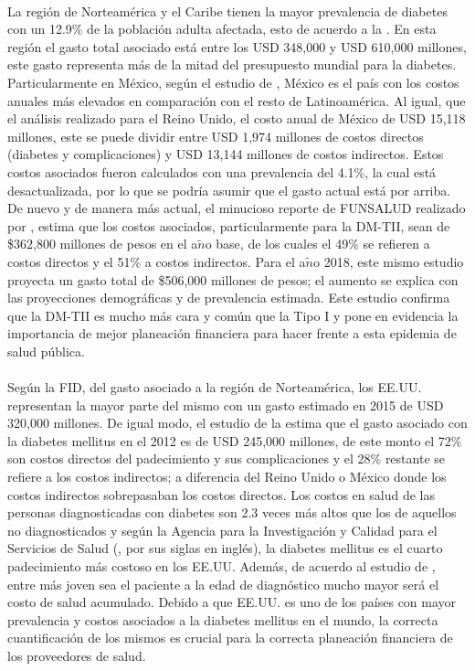 \\
La regi\'on de Norteam\'erica y el Caribe tienen la mayor prevalencia de diabetes con un 12.9\% de la poblaci\'on adulta afectada, esto de acuerdo a la \cite{atlas2015international}. En esta regi\'on el gasto total asociado est\'a entre los USD 348,000 y USD 610,000 millones, este gasto representa m\'as de la mitad del presupuesto mundial para la diabetes. Particularmente en M\'exico, seg\'un el estudio de \cite{barcelo2003cost}, M\'exico es el pa\'is con los costos anuales m\'as elevados en comparaci\'on con el resto de Latinoam\'erica. Al igual, que el an\'alisis realizado para el Reino Unido, el costo anual de M\'exico de USD 15,118 millones, este se puede dividir entre USD 1,974 millones de costos directos (diabetes y complicaciones) y USD 13,144 millones de costos indirectos. Estos costos asociados fueron calculados con una prevalencia del 4.1\%, la cual est\'a desactualizada, por lo que se podr\'ia asumir que el gasto actual est\'a por arriba. De nuevo y de manera m\'as actual, el minucioso reporte de FUNSALUD realizado por \cite{barraza2015carga}, estima que los costos asociados, particularmente para la DM-TII, sean de \$362,800 millones de pesos en el a$\tilde{n}$o base, de los cuales el 49\% se refieren a costos directos y el 51\% a costos indirectos. Para el a$\tilde{n}$o 2018, este mismo estudio proyecta un gasto total de \$506,000 millones de pesos; el aumento se explica con las proyecciones demogr\'aficas y de prevalencia estimada. Este estudio confirma que la DM-TII es mucho m\'as cara y com\'un que la Tipo I y pone en evidencia la importancia de mejor planeaci\'on financiera para hacer frente a esta epidemia de salud p\'ublica.\\
\\   
Seg\'un la FID, del gasto asociado a la regi\'on de Norteam\'erica, los EE.UU. representan la mayor parte del mismo con un gasto estimado en 2015 de USD 320,000 millones. De igual modo, el estudio de la \cite{american2013economic} estima que el gasto asociado con la diabetes mellitus en el 2012 es de USD 245,000 millones, de este monto el 72\% son costos directos del padecimiento y sus complicaciones y el 28\% restante se refiere a los costos indirectos; a diferencia del Reino Unido o M\'exico donde los costos indirectos sobrepasaban los costos directos. Los costos en salud de las personas diagnosticadas con diabetes son 2.3 veces m\'as altos que los de aquellos no diagnosticados y seg\'un la Agencia para la Investigaci\'on y Calidad para el Servicios de Salud (\cite{MEPSSummary}, por sus siglas en ingl\'es), la diabetes mellitus es el cuarto padecimiento m\'as costoso en los EE.UU. Adem\'as, de acuerdo al estudio de \cite{zhuo2014lifetime}, entre m\'as joven sea el paciente a la edad de diagn\'ostico mucho mayor ser\'a el costo de salud acumulado. Debido a que EE.UU. es uno de los pa\'ises con mayor prevalencia y costos asociados a la diabetes mellitus en el mundo, la correcta cuantificaci\'on de los mismos es crucial para la correcta planeaci\'on financiera de los proveedores de salud.\\
